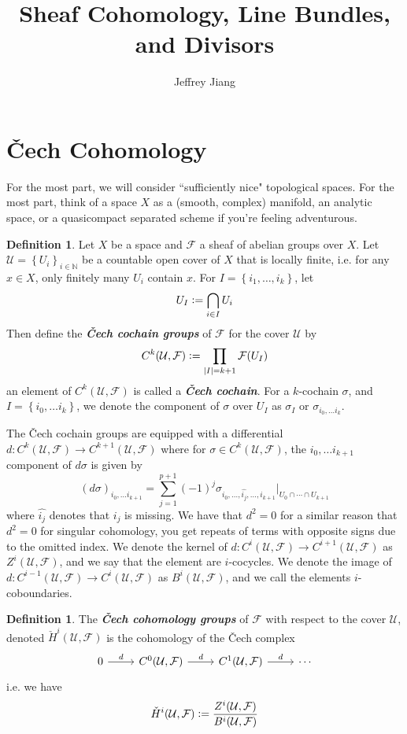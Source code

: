 \documentclass[psamsfonts, 12pt]{amsart}
\theoremstyle{definition}
\newtheorem{defn}[thm]{Definition}
\theoremstyle{remark}
\newcommand{\ib}[1]{\textbf{\textit{#1}}}
\newcommand{\N}{\mathbb{N}}
\newcommand{\set}[1]{\left\lbrace #1 \right\rbrace}
\newcommand{\defeq}{\vcentcolon=}
\begin{document}
%
\author{Jeffrey Jiang}
%
\title{Sheaf Cohomology, Line Bundles, and Divisors}
%
\maketitle
%
\tableofcontents
%
\section{\v{C}ech Cohomology}
%
For the most part, we will consider ``sufficiently nice" topological spaces.
For the most part, think of a space $X$ as a (smooth, complex) manifold, an analytic
space, or a quasicompact separated scheme if you're feeling adventurous.
%
\begin{defn}
Let $X$ be a space and $\mathcal{F}$ a sheaf of abelian groups over $X$. Let
$\mathcal{U} = \set{U_i}_{i \in \N}$ be a countable open cover of $X$ that is locally
finite, i.e. for any $x \in X$, only finitely many $U_i$ contain $x$. For
$I = \set{i_1, \ldots, i_k}$, let
\[
U_I \defeq \bigcap_{i \in I} U_i
\]
Then define the \ib{\v{C}ech cochain groups} of $\mathcal{F}$ for the cover
$\mathcal{U}$ by
\begin{align*}
C^k(\mathcal{U}, \mathcal{F}) \defeq \prod_{|I| = k+1} \mathcal{F}(U_I)
\end{align*}
an element of $C^k(\mathcal{U},\mathcal{F})$ is called a \ib{\v{C}ech cochain}.
For a $k$-cochain $\sigma$, and $I = \set{i_0,\ldots i_k}$, we denote the
component of $\sigma$ over $U_I$ as $\sigma_I$ or $\sigma_{i_0,\ldots i_k}$.
\end{defn}
%
The \v{C}ech cochain groups are equipped with a differential
$d : C^k(\mathcal{U}, \mathcal{F}) \to C^{k+1}(\mathcal{U}, \mathcal{F})$
where for $\sigma \in C^k(\mathcal{U}, \mathcal{F})$, the ${i_0, \ldots i_{k+1}}$
component of $d\sigma$ is given by
\[
(d\sigma)_{i_0, \ldots i_{k+1}}
= \sum_{j = 1}^{p+1}(-1)^j\sigma_{i_0, \ldots, \widehat{i_j}, \ldots, i_{k+1}}
\vert_{U_0 \cap \cdots \cap U_{k+1}}
\]
where $\widehat{i_j}$ denotes that $i_j$ is missing. We have that $d^2 = 0$ for a
similar reason that $d^2 = 0$ for singular cohomology, you get repeats of
terms with opposite signs due to the omitted index. We denote the kernel of
$d : C^i(\mathcal{U}, \mathcal{F}) \to C^{i+1}(\mathcal{U}, \mathcal{F})$ as
$Z^i(\mathcal{U}, \mathcal{F})$, and we say that the element are $i$-cocycles.
We denote the image of
$d : C^{i-1}(\mathcal{U}, \mathcal{F}) \to C^i(\mathcal{U}, \mathcal{F})$ as
$B^i(\mathcal{U}, \mathcal{F})$, and we call the elements $i$-coboundaries.
%
\begin{defn}
The \ib{\v{C}ech cohomology groups} of $\mathcal{F}$ with respect to the cover
$\mathcal{U}$, denoted $\check{H}^i(\mathcal{U}, \mathcal{F})$ is the cohomology of
the \v{C}ech complex
\[\begin{tikzcd}
0 \ar[r, "d"] & C^0(\mathcal{U}, \mathcal{F}) \ar[r, "d"] &
C^1(\mathcal{U}, \mathcal{F}) \ar[r, "d"]
& \cdots
\end{tikzcd}\]
i.e. we have
\[
\check{H}^i(\mathcal{U}, \mathcal{F}) \defeq
\frac{Z^i(\mathcal{U}, \mathcal{F})}{B^i(\mathcal{U}, \mathcal{F})}
\]
\end{defn}
\end{document}
